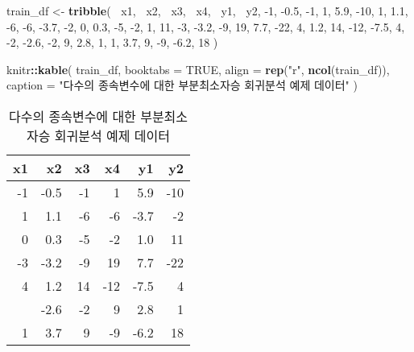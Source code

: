 \documentclass[]{book}
\newenvironment{Shaded}{\begin{snugshade}}{\end{snugshade}}
\newcommand{\DataTypeTok}[1]{\textcolor[rgb]{0.13,0.29,0.53}{#1}}
\newcommand{\DecValTok}[1]{\textcolor[rgb]{0.00,0.00,0.81}{#1}}
\newcommand{\FloatTok}[1]{\textcolor[rgb]{0.00,0.00,0.81}{#1}}
\newcommand{\KeywordTok}[1]{\textcolor[rgb]{0.13,0.29,0.53}{\textbf{#1}}}
\newcommand{\NormalTok}[1]{#1}
\newcommand{\OperatorTok}[1]{\textcolor[rgb]{0.81,0.36,0.00}{\textbf{#1}}}
\newcommand{\OtherTok}[1]{\textcolor[rgb]{0.56,0.35,0.01}{#1}}
\newcommand{\StringTok}[1]{\textcolor[rgb]{0.31,0.60,0.02}{#1}}
\begin{document}
\begin{Shaded}
\begin{Highlighting}[]
\NormalTok{train_df <-}\StringTok{ }\KeywordTok{tribble}\NormalTok{(}
  \OperatorTok{~}\NormalTok{x1, }\OperatorTok{~}\NormalTok{x2, }\OperatorTok{~}\NormalTok{x3, }\OperatorTok{~}\NormalTok{x4, }\OperatorTok{~}\NormalTok{y1, }\OperatorTok{~}\NormalTok{y2,}
  \DecValTok{-1}\NormalTok{, }\FloatTok{-0.5}\NormalTok{, }\DecValTok{-1}\NormalTok{, }\DecValTok{1}\NormalTok{, }\FloatTok{5.9}\NormalTok{, }\DecValTok{-10}\NormalTok{,}
  \DecValTok{1}\NormalTok{, }\FloatTok{1.1}\NormalTok{, }\DecValTok{-6}\NormalTok{, }\DecValTok{-6}\NormalTok{, }\FloatTok{-3.7}\NormalTok{, }\DecValTok{-2}\NormalTok{,}
  \DecValTok{0}\NormalTok{, }\FloatTok{0.3}\NormalTok{, }\DecValTok{-5}\NormalTok{, }\DecValTok{-2}\NormalTok{, }\DecValTok{1}\NormalTok{, }\DecValTok{11}\NormalTok{,}
  \DecValTok{-3}\NormalTok{, }\FloatTok{-3.2}\NormalTok{, }\DecValTok{-9}\NormalTok{, }\DecValTok{19}\NormalTok{, }\FloatTok{7.7}\NormalTok{, }\DecValTok{-22}\NormalTok{,}
  \DecValTok{4}\NormalTok{, }\FloatTok{1.2}\NormalTok{, }\DecValTok{14}\NormalTok{, }\DecValTok{-12}\NormalTok{, }\FloatTok{-7.5}\NormalTok{, }\DecValTok{4}\NormalTok{,}
  \DecValTok{-2}\NormalTok{, }\FloatTok{-2.6}\NormalTok{, }\DecValTok{-2}\NormalTok{, }\DecValTok{9}\NormalTok{, }\FloatTok{2.8}\NormalTok{, }\DecValTok{1}\NormalTok{,}
  \DecValTok{1}\NormalTok{, }\FloatTok{3.7}\NormalTok{, }\DecValTok{9}\NormalTok{, }\DecValTok{-9}\NormalTok{, }\FloatTok{-6.2}\NormalTok{, }\DecValTok{18}
\NormalTok{)}

\NormalTok{knitr}\OperatorTok{::}\KeywordTok{kable}\NormalTok{(}
\NormalTok{  train_df, }\DataTypeTok{booktabs =} \OtherTok{TRUE}\NormalTok{,}
  \DataTypeTok{align =} \KeywordTok{rep}\NormalTok{(}\StringTok{"r"}\NormalTok{, }\KeywordTok{ncol}\NormalTok{(train_df)),}
  \DataTypeTok{caption =} \StringTok{"다수의 종속변수에 대한 부분최소자승 회귀분석 예제 데이터"}
\NormalTok{)}
\end{Highlighting}
\end{Shaded}

\begin{table}[t]

\caption{\label{tab:plsr-multivariate-example-data}다수의 종속변수에 대한 부분최소자승 회귀분석 예제 데이터}
\centering
\begin{tabular}{rrrrrr}
\toprule
x1 & x2 & x3 & x4 & y1 & y2\\
\midrule
-1 & -0.5 & -1 & 1 & 5.9 & -10\\
1 & 1.1 & -6 & -6 & -3.7 & -2\\
0 & 0.3 & -5 & -2 & 1.0 & 11\\
-3 & -3.2 & -9 & 19 & 7.7 & -22\\
4 & 1.2 & 14 & -12 & -7.5 & 4\\
\addlinespace
-2 & -2.6 & -2 & 9 & 2.8 & 1\\
1 & 3.7 & 9 & -9 & -6.2 & 18\\
\bottomrule
\end{tabular}
\end{table}
\end{document}
